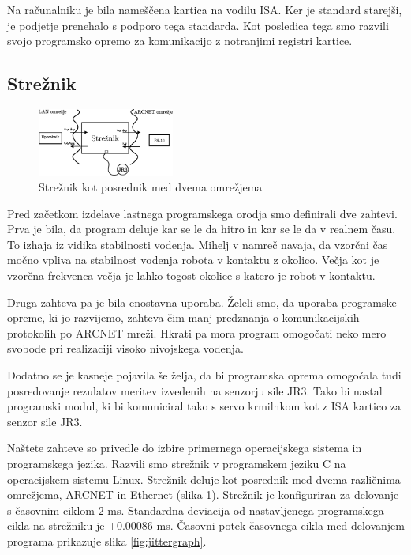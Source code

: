 \documentclass[a4paper]{article}
\begin{document}
Na računalniku je bila nameščena kartica na vodilu ISA. Ker je standard starejši, je podjetje prenehalo s podporo tega standarda. Kot posledica tega smo razvili svojo programsko opremo za komunikacijo z notranjimi registri kartice.

\subsection{Strežnik} \label{sec:streznik}

\begin{figure}[!t]
	\centering
	\includegraphics[width=0.4\textwidth]{./slike/udp-arcnet-server.eps}
	\caption{Strežnik kot posrednik med dvema omrežjema}
	\label{fig:server}
\end{figure}

Pred začetkom izdelave lastnega programskega orodja smo definirali dve zahtevi. Prva je bila, da program deluje kar se le da hitro in kar se le da v realnem času. To izhaja iz vidika stabilnosti vodenja. Mihelj v \cite{mihelj_hapt} namreč navaja, da vzorčni čas močno vpliva na stabilnost vodenja robota v kontaktu z okolico. Večja kot je vzorčna frekvenca večja je lahko togost okolice s katero je robot v kontaktu.

Druga zahteva pa je bila enostavna uporaba. Želeli smo, da uporaba programske opreme, ki jo razvijemo, zahteva čim manj predznanja o komunikacijskih protokolih po ARCNET mreži. Hkrati pa mora program omogoča\-ti neko mero svobode pri realizaciji visoko nivojskega vodenja.

Dodatno se je kasneje pojavila še želja, da bi programska oprema omogočala tudi posredovanje rezulatov meritev izvedenih na senzorju sile JR3. Tako bi nastal programski modul, ki bi komuniciral tako s servo krmilnkom kot z ISA kartico za senzor sile JR3.

Naštete zahteve so privedle do izbire primernega operacijskega sistema in programskega jezika. Razvili smo strežnik v programskem jeziku C na operacijskem sistemu Linux. Strežnik deluje kot posrednik med dvema različnima omrežjema, ARCNET in Ethernet (slika \ref{fig:server}). Stre\-žnik je konfiguriran za delovanje s časovnim ciklom $2$ ms. Standardna deviacija od nastavljenega programskega cikla na strežniku je  $\pm 0.00086 $ ms. Časovni potek časovnega cikla med delovanjem programa prikazuje slika \ref{fig:jittergraph}.
\end{document}
